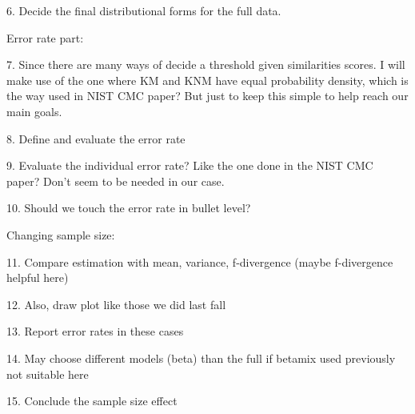 \documentclass[12pt]{article}         %
\begin{document}
6.	Decide the final distributional forms for the full data.

Error rate part:

7.	Since there are many ways of decide a threshold given similarities scores. I will make use of the one where KM and KNM have equal probability density, which is the way used in NIST CMC paper? But just to keep this simple to help reach our main goals.

8.	Define and evaluate the error rate

9.	Evaluate the individual error rate? Like the one done in the NIST CMC paper? Don’t seem to be needed in our case.

10.	Should we touch the error rate in bullet level?

Changing sample size:

11.	Compare estimation with mean, variance, f-divergence (maybe f-divergence helpful here)

12.	Also, draw plot like those we did last fall

13.	Report error rates in these cases

14.	May choose different models (beta) than the full if betamix used previously not suitable here

15.	Conclude the sample size effect
\end{document}
